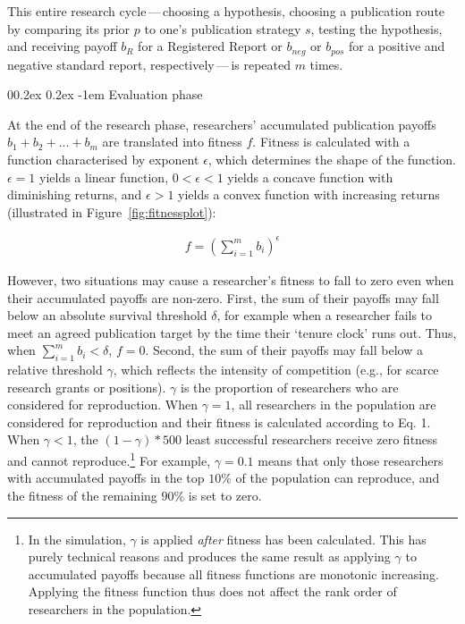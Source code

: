 \documentclass[
  ,man,mask,floatsintext]{apa6}
\makeatletter
\let\oldparagraph\paragraph
\renewcommand{\paragraph}[1]{\oldparagraph{#1}\mbox{}}
\renewcommand{\paragraph}{\@startsection{paragraph}{4}{\parindent}%
  {0\baselineskip \@plus 0.2ex \@minus 0.2ex}%
  {-1em}%
  {\normalfont\normalsize\bfseries\itshape\typesectitle}}
\makeatother
\begin{document}
This entire research cycle\(\,\)---\(\,\)choosing a hypothesis, choosing a publication route by comparing its prior \(p\) to one's publication strategy \(s\), testing the hypothesis, and receiving payoff \(b_{R}\) for a Registered Report or \(b_{neg}\) or \(b_{pos}\) for a positive and negative standard report, respectively\(\,\)---\(\,\)is repeated \(m\) times.

\hypertarget{evaluation-phase}{%
\paragraph{Evaluation phase}\label{evaluation-phase}}

At the end of the research phase, researchers' accumulated publication payoffs \(b_1 + b_2 + ... + b_m\) are translated into fitness \(f\).
Fitness is calculated with a function characterised by exponent \(\epsilon\), which determines the shape of the function. \(\epsilon = 1\) yields a linear function, \(0 < \epsilon < 1\) yields a concave function with diminishing returns, and \(\epsilon > 1\) yields a convex function with increasing returns (illustrated in Figure~\ref{fig:fitnessplot}):

\begin{align}
f = (\sum_{i=1}^{m} b_i)^\epsilon
\end{align}

However, two situations may cause a researcher's fitness to fall to zero even when their accumulated payoffs are non-zero.
First, the sum of their payoffs may fall below an absolute survival threshold \(\delta\), for example when a researcher fails to meet an agreed publication target by the time their `tenure clock' runs out.
Thus, when \(\sum_{i=1}^{m} b_i < \delta\), \(f = 0\).
Second, the sum of their payoffs may fall below a relative threshold \(\gamma\), which reflects the intensity of competition (e.g., for scarce research grants or positions).
\(\gamma\) is the proportion of researchers who are considered for reproduction.
When \(\gamma = 1\), all researchers in the population are considered for reproduction and their fitness is calculated according to Eq. 1.
When \(\gamma < 1\), the \((1 - \gamma)*500\) least successful researchers receive zero fitness and cannot reproduce.\footnote{In the simulation, \(\gamma\) is applied \emph{after} fitness has been calculated. This has purely technical reasons and produces the same result as applying \(\gamma\) to accumulated payoffs
  because all fitness functions are monotonic increasing.
  Applying the fitness function thus does not affect the rank order of researchers in the population.}
For example, \(\gamma = 0.1\) means that only those researchers with accumulated payoffs in the top \(10\%\) of the population can reproduce, and the fitness of the remaining \(90\%\) is set to zero.
\end{document}
